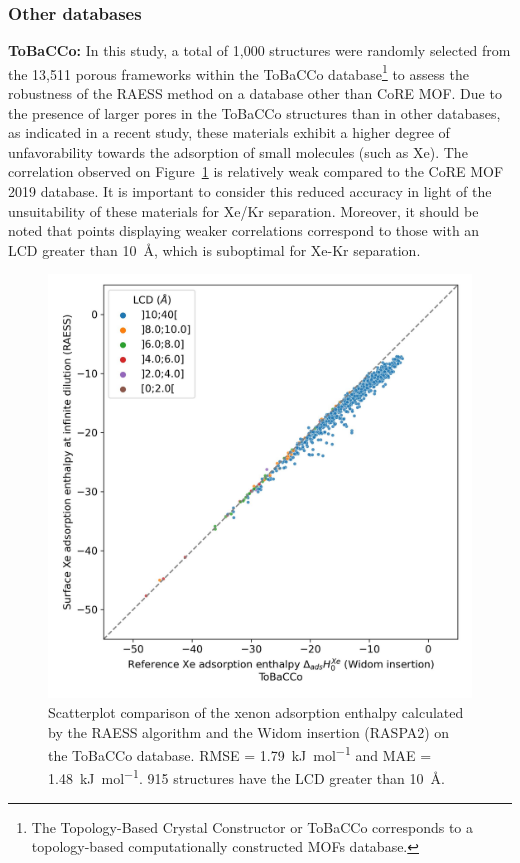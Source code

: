 \documentclass[main]{subfiles}
\begin{document}
\subsubsection{Other databases}\label{sct:other_database}

\textbf{ToBaCCo:}
In this study, a total of 1,000 structures were randomly selected from the 13,511 porous frameworks within the ToBaCCo database\footnote[1]{The Topology-Based Crystal Constructor or ToBaCCo corresponds to a topology-based computationally constructed MOFs database. } to assess the robustness of the RAESS method on a database other than CoRE MOF. Due to the presence of larger pores in the ToBaCCo structures than in other databases, as indicated in a recent study,\autocite{Moosavi_2020} these materials exhibit a higher degree of unfavorability towards the adsorption of small molecules (such as Xe). The correlation observed on Figure~\ref{fgr:tobacco} is relatively weak compared to the CoRE MOF 2019 database. It is important to consider this reduced accuracy in light of the unsuitability of these materials for Xe/Kr separation. Moreover, it should be noted that points displaying weaker correlations correspond to those with an LCD greater than \SI{10}{\angstrom}, which is suboptimal for Xe-Kr separation.

\begin{figure}[h!]
\centering
  \includegraphics[width=0.5\linewidth]{figures/3-fastsim/H_Xe_0_widom_vs_Enthalpy_surface_kjmol_overview_tobacco.jpeg}
  \caption{Scatterplot comparison of the xenon adsorption enthalpy calculated by the RAESS algorithm and the Widom insertion (RASPA2) on the ToBaCCo database. RMSE = \SI{1.79}{\kilo\joule\per\mole} and MAE = \SI{1.48}{\kilo\joule\per\mole}. 915 structures have the LCD greater than \SI{10}{\angstrom}.}\label{fgr:tobacco}
\end{figure}
\end{document}
